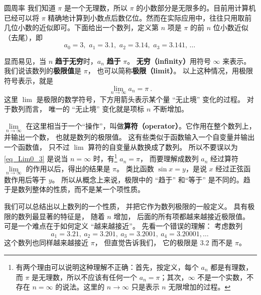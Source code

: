 \begin{example}{圆周率}\label{ex_Lim0_2}
我们知道 $\pi$ 是一个无理数，所以 $\pi$ 的小数部分是无限多的。目前用计算机已经可以将 $\pi$ 精确地计算到小数点后数亿位。然而在实际应用中，往往只用取前几位小数的近似即可。下面给出一个数列，定义第 $n$ 项是 $\pi$ 的前 $n$ 位小数近似（去尾），即
\begin{equation}\label{eq_Lim0_1}
a_0 = 3,\,\, a_1 = 3.1,\,\, a_2 = 3.14,\,\, a_3 = 3.141,\,\dots~
\end{equation}

显而易见，当 $n$ \textbf{趋于无穷}时，$a_n$ \textbf{趋于} $\pi$。 \textbf{无穷（infinity）}用符号 $\infty$ 来表示。 我们说该数列的\textbf{极限值}是 $\pi$， 也可以简称\textbf{极限（limit）}。 以上这种情况，用极限符号表示，就是
\begin{equation}\label{eq_Lim0_3}
\lim_{n \to \infty } {a_n} = \pi ~.
\end{equation}
这里 $\lim$ 是极限的数学符号，下方用箭头表示某个量 “无止境” 变化的过程。 对于数列而言， 唯一的 “无止境” 变化就是项标 $n$ 不断增加。%
\end{example}

$\lim\limits_{n \to \infty }$ 在这里相当于一个“操作”，叫做\textbf{算符（operator）}。它作用在整个数列上，并输出一个数， 也就是数列的极限值。 这有些类似于函数输入一个自变量并输出一个函数值， 只不过 $\lim$ 算符的自变量从数换成了数列。 所以不要误以为\autoref{eq_Lim0_3} 是说当 $n = \infty$ 时，有\footnote{有两个理由可以说明这种理解不正确：首先，按定义，每个 $a_n$ 都是有理数，而 $\pi$ 是无理数，所以不应该有任何一个 $a_n=\pi$；其次，$\infty$ 不是一个实数，不存在 $n=\infty$ 的说法。这里的 $n\to\infty$ 只是表示 $n$ 无限增加的过程。} $a_n=\pi$， 而要理解成数列 $a_n$ 经过算符 $\lim\limits_{n \to \infty }$ 的作用以后，得出的结果是 $\pi$。 类比函数 $\sin x = y$，是说 $x$ 经过正弦函数作用后等于 $y$。 所以从概念上来说，极限中的 “趋于” 和“等于” 是不同的。趋于是数列整体的性质，而不是某一个项性质。

我们可以总结出以上数列的一个性质， 并把它作为数列极限的一般定义。 具有极限的数列最显著的特征是， 随着 $n$ 增加， 后面的所有项都越来越接近极限值。 可是一个难点在于如何定义 “越来越接近”。 先看一个错误的理解： 考虑数列
\begin{equation}\label{eq_Lim0_2}
a_1 = 3.21,\ a_2 = 3.201,\ a_3 = 3.2001,\ a_4 = 3.20001, \dots~
\end{equation}
这个数列也同样越来越接近 $\pi$， 但直觉告诉我们， 它的极限是 $3.2$ 而不是 $\pi$。

